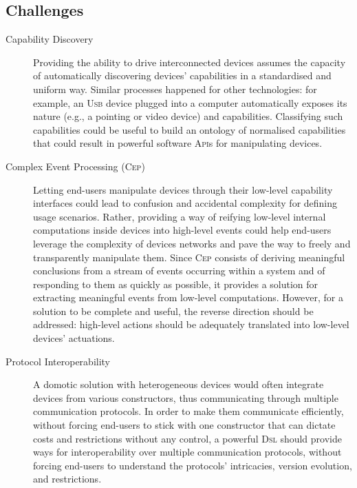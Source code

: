 \subsection{Challenges}
\label{sec:Challenges}


\begin{description}
	\item[Capability Discovery] Providing the ability to drive interconnected devices assumes the capacity of automatically discovering devices' capabilities in a standardised and uniform way. Similar processes happened for other technologies: for example, an \textsc{Usb} device plugged into a computer automatically exposes its nature (e.g., a pointing or video device) and capabilities. Classifying such capabilities could be useful to build an ontology of normalised capabilities that could result in powerful software \textsc{Api}s for manipulating devices. 
		
	\item[Complex Event Processing (\textsc{Cep})] Letting end-users manipulate devices through their low-level capability interfaces could lead to confusion and accidental complexity for defining usage scenarios. Rather, providing a way of reifying low-level internal computations inside devices into high-level events could help end-users leverage the complexity of devices networks and pave the way to freely and transparently manipulate them. Since \textsc{Cep} consists of deriving meaningful conclusions from a stream of events occurring within a system and of responding to them as quickly as possible, it provides a solution for extracting meaningful events from low-level computations. However, for a solution to be complete and useful, the reverse direction should be addressed: high-level actions should be adequately translated into low-level devices' actuations. 
		
	\item[Protocol Interoperability] A domotic solution with heterogeneous devices would often integrate devices from various constructors, thus communicating through multiple communication protocols. In order to make them communicate efficiently, without forcing end-users to stick with one constructor that can dictate costs and restrictions without any control, a powerful \textsc{Dsl} should provide ways for interoperability over multiple communication protocols, without forcing end-users to understand the protocols' intricacies, version evolution, and restrictions.
	

\end{description}

